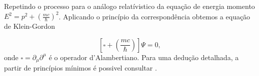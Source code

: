 \documentclass[a4paper,14pt]{extarticle}
\begin{document}
Repetindo o processo para o análogo relatívistico da equação de energia momento $E^2 = p^2 + \left(\frac{mc}{\hbar}\right)^2$. Aplicando o princípio da correspondência 
obtemos a equação de Klein-Gordon

\begin{equation}
  \left[\square + \left(\frac{mc}{\hbar}\right)\right]\Psi = 0, 
\end{equation}
onde $\square = \partial_\mu \partial^{\mu}$ é o operador d'Alambertiano. Para uma dedução detalhada, a partir de princípios mínimos é possivel consultar \cite[Groessing]{groessing2002derivation}.

{}

\end{document}

